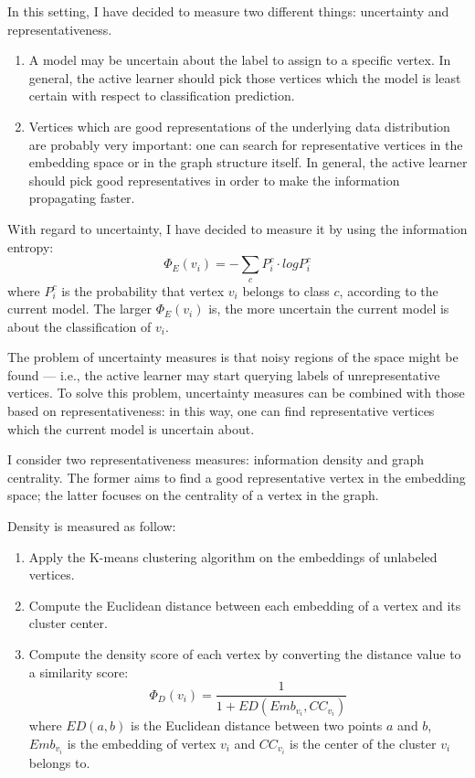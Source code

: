             In this setting, I have decided to measure two different things: uncertainty and representativeness.
            \begin{enumerate}
                \item A model may be uncertain about the label to assign to a specific vertex. In general, the active learner should pick those vertices which the model is least certain with respect to classification prediction.
                \item Vertices which are good representations of the underlying data distribution are probably very important: one can search for representative vertices in the embedding space or in the graph structure itself. In general, the active learner should pick good representatives in order to make the information propagating faster.
            \end{enumerate}
            
            With regard to uncertainty, I have decided to measure it by using the information entropy:
            \[\Phi_E\left(v_i\right) = -\sum_{c}P_i^c \cdot log P_i^c\]
            where \(P_i^c\) is the probability that vertex \(v_i\) belongs to class \(c\), according to the current model. The larger \(\Phi_E\left(v_i\right)\) is, the more uncertain the current model is about the classification of \(v_i\).
            
            The problem of uncertainty measures is that noisy regions of the space might be found --- i.e., the active learner may start querying labels of unrepresentative vertices. To solve this problem, uncertainty measures can be combined with those based on representativeness: in this way, one can find representative vertices which the current model is uncertain about.
            
            I consider two representativeness measures: information density and graph centrality. The former aims to find a good representative vertex in the embedding space; the latter focuses on the centrality of a vertex in the graph.
            
            Density is measured as follow:
            \begin{enumerate}
                \item Apply the K-means clustering algorithm on the embeddings of unlabeled vertices.
                \item Compute the Euclidean distance between each embedding of a vertex and its cluster center.
                \item Compute the density score of each vertex by converting the distance value to a similarity score:
                \[\Phi_D\left(v_i\right) = \frac{1}{1+ED\left(Emb_{v_i},CC_{v_i}\right)}\]
                where \(ED\left(a,b\right)\) is the Euclidean distance between two points \(a\) and \(b\), \(Emb_{v_i}\) is the embedding of vertex \(v_i\) and \(CC_{v_i}\) is the center of the cluster \(v_i\) belongs to.
            \end{enumerate}
            
